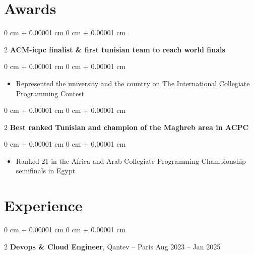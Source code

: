 \documentclass[10pt, letterpaper]{article}
\newenvironment{highlights}{ \begin{itemize}[ topsep=0.10 cm, parsep=0.10 cm, partopsep=0pt,
itemsep=0pt, leftmargin=0 cm + 10pt ] }{ \end{itemize} } %
\newenvironment{onecolentry}{ \begin{adjustwidth}{ 0 cm + 0.00001 cm }{ 0 cm + 0.00001 cm }
}{ \end{adjustwidth} } %
\newenvironment{twocolentry}[2][]{ \onecolentry \def\secondColumn{#2} \setcolumnwidth{\fill, 4.5 cm}
\begin{paracol}{2} }{ \switchcolumn \raggedleft \secondColumn \end{paracol}
\endonecolentry } %
\begin{document}
	\section{Awards}

	\begin{twocolentry}
		{ 2021 } \textbf{ACM-icpc finalist \& first tunisian team to reach world
		finals}
	\end{twocolentry}

	\vspace{0.10 cm}
	\begin{onecolentry}
		\begin{highlights}
			\item Represented the university and the country on The International Collegiate
			Programming Contest
		\end{highlights}
	\end{onecolentry}

	\vspace{0.20 cm}
	\begin{twocolentry}
		{ 2019 } \textbf{Best ranked Tunisian and champion of the Maghreb area in
		ACPC}
	\end{twocolentry}

	\vspace{0.10 cm}
	\begin{onecolentry}
		\begin{highlights}
			\item Ranked 21 in the Africa and Arab Collegiate Programming Championship
			semifinals in Egypt
		\end{highlights}
	\end{onecolentry}

	\section{Experience}

	\vspace{0.10 cm}

	\begin{twocolentry}
		{ Aug 2023 – Jan 2025 } \textbf{Devops \& Cloud Engineer}, Qantev -- Paris
	\end{twocolentry}
\end{document}
